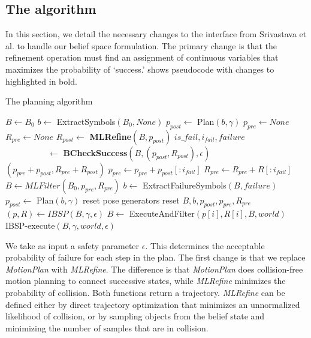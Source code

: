 \subsection{The \ibsp{} algorithm}
\label{sec-ibsp}
In this section, we detail the necessary changes to the interface from
Srivastava et al. to handle our belief space formulation. The primary
change is that the refinement operation must find an assignment of
continuous variables that maximizes the probability of
`success.'  shows pseudocode with changes to  highlighted in bold.

\begin{algorithm}
 \caption{The \ibsp{} planning algorithm} \label{alg-ibsp}
 \begin{algorithmic}[1]
  \State $B \leftarrow B_0$
  \State $b \leftarrow $ ExtractSymbols$(B_0, None)$
  \State $p_{post} \leftarrow $ Plan$(b, \gamma)$
  \State $p_{pre} \leftarrow None$
  \State $R_{pre} \leftarrow None$
     \State $R_{post} \leftarrow $ \textbf{MLRefine}$(B, p_{post})$
     \State $is\_fail,i_{fail}, failure$\\\ \ \ \ \ \ \ \ \ \ $\leftarrow $ \textbf{BCheckSuccess}$(B, (p_{post}, R_{post}), \epsilon)$
         \State \Return $(p_{pre} + p_{post}, R_{pre} + R_{post})$
     \EndIf
     \State $p_{pre} \leftarrow p_{pre} + p_{post}[:i_{fail}]$
     \State $R_{pre} \leftarrow R_{pre} + R[:i_{fail}]$
     \State $B \leftarrow MLFilter(B_0, p_{pre}, R_{pre})$
     \State $b\leftarrow $ ExtractFailureSymbols$(B, failure)$
     \State $p_{post} \leftarrow $ Plan$(b, \gamma)$     
        \State reset pose generators
        \State reset $B, b, p_{post}, p_{pre}, R_{pre}$
     \EndIf
  \EndWhile
  \EndProcedure
    \State $(p, R) \leftarrow IBSP(B, \gamma, \epsilon)$
      \State $B \leftarrow$ ExecuteAndFilter$(p[i], R[i], B, world)$
        \State \Return IBSP-execute$(B, \gamma, world, \epsilon)$
      \EndIf
    \EndFor
  \EndProcedure
 \end{algorithmic}
\end{algorithm}


We take as input a safety parameter $\epsilon$. This determines the
acceptable probability of failure for each step in the plan. The first
change is that we replace \emph{MotionPlan} with \emph{MLRefine}. The
difference is that \emph{MotionPlan} does collision-free motion
planning to connect successive states, while \emph{MLRefine} minimizes
the probability of collision. Both functions return a trajectory. \emph{MLRefine} can be defined either by
direct trajectory optimization that minimizes an unnormalized likelihood of collision,
or by sampling objects from the belief state and minimizing the number
of samples that are in collision.

